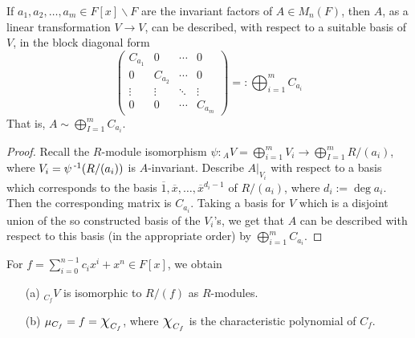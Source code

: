 \documentclass[11pt]{book}
\theoremstyle{definition}   \newtheorem{defn}[counter]{Definition} %
\newcommand{\ov}{\overline}   \newcommand{\wt}{\widetilde}
\newcommand{\bs}{\backslash}   \newcommand{\A}{\mathcal{A}}   \newcommand{\sy}{\textnormal{Syl}}   \newcommand{\size}[1]{\left| #1 \right|}
\newcommand{\mymatrix}[2]{\left( \begin{array}{#1} #2 \end{array} \right)}
\newcommand{\Chi}{\mbox{\Large $\chi$}}
\DeclareMathOperator{\ra}{\rightarrow}   \DeclareMathOperator{\Poly}{\mathbf{P}}   \DeclareMathOperator{\spn}{\textnormal{span}}   \DeclareMathOperator{\aut}{\textnormal{Aut}}
\newcommand{\vs}{\vspace{8pt}}
\numberwithin{counter}{chapter}
\begin{document}
\begin{corollary}
If $a_1,a_2,\dots,a_m \in F[x]\bs F$ are the invariant factors of $A \in M_n(F)$, then $A$, as a linear transformation $V \ra V$, can be described, with respect to a suitable basis of $V$, in the block diagonal form
	\[\mymatrix{cccc}{C_{a_1} & 0 & \cdots & 0 \\
	                  0 & C_{a_2} & \cdots & 0 \\
	                  \vdots & \vdots & \ddots & \vdots \\
	                  0 & 0 & \cdots & C_{a_m}} =: \bigoplus_{i=1}^m C_{a_i} \]
That is, $A \sim \bigoplus_{I=1}^m C_{a_i}$.
\end{corollary}

\begin{proof}
Recall the $R$-module isomorphism $\psi : {_AV} = \bigoplus_{i=1}^m V_i \ra \bigoplus_{I=1}^m R/(a_i)$, where $V_i = \psi\operatorname{^{-1}}(R/(a_i))$ is $A$-invariant. Describe $A|_{V_i}$ with respect to a basis which corresponds to the basis $\ov{1},\ov{x},\dots,\ov{x}^{d_{i} - 1}$ of $R/(a_i)$, where $d_i := \deg a_i$. Then the corresponding matrix is $C_{a_i}$. Taking a basis for $V$ which is a disjoint union of the so constructed basis of the $V_i$'s, we get that $A$ can be described with respect to this basis (in the appropriate order) by $\bigoplus_{i=1}^m C_{a_i}$.
\end{proof}

\vs

\begin{lemma}
For $f = \sum_{i=0}^{n-1} c_i x^i + x^n \in F[x]$, we obtain
\begin{enumerate}
\item[(a)] $_{C_f}V$ is isomorphic to $R/(f)$ as $R$-modules.
\item[(b)] $\mu_{C_f} = f = \Chi_{C_f}$, where $\Chi_{C_f}$ is the characteristic polynomial of $C_f$.
\end{enumerate}
\end{lemma}
\end{document}
